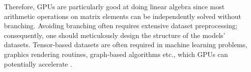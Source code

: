 Therefore, GPUs are particularly good at doing linear algebra \cite{PattersonARM, ParallelNVIDIA} since most arithmetic operations on matrix elements can be independently solved without branching. Avoiding branching often requires extensive dataset preprocessing; consequently, one should meticulously design the structure of the models' datasets. Tensor-based datasets are often required in machine learning problems, graphics rendering routines, graph-based algorithms etc., which GPUs can potentially accelerate \cite{PattersonARM}.